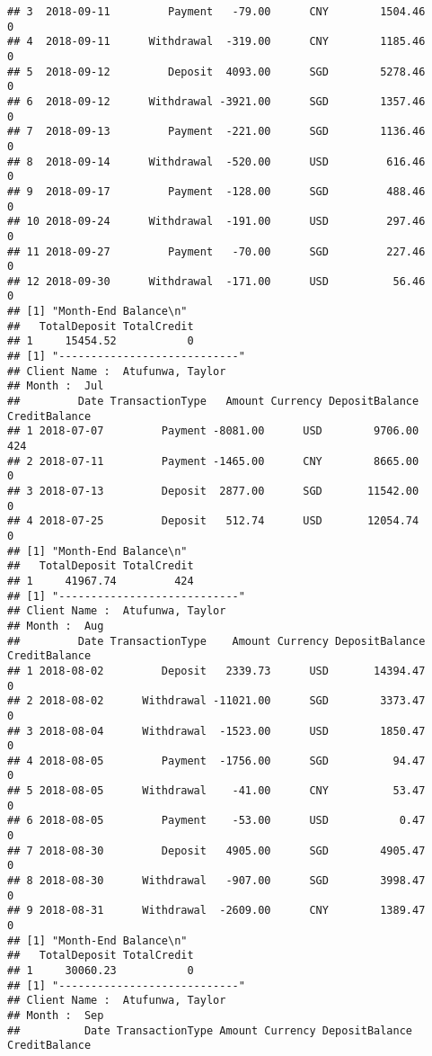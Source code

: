 \documentclass[]{article}
\begin{document}
\begin{verbatim}
## 3  2018-09-11         Payment   -79.00      CNY        1504.46             0
## 4  2018-09-11      Withdrawal  -319.00      CNY        1185.46             0
## 5  2018-09-12         Deposit  4093.00      SGD        5278.46             0
## 6  2018-09-12      Withdrawal -3921.00      SGD        1357.46             0
## 7  2018-09-13         Payment  -221.00      SGD        1136.46             0
## 8  2018-09-14      Withdrawal  -520.00      USD         616.46             0
## 9  2018-09-17         Payment  -128.00      SGD         488.46             0
## 10 2018-09-24      Withdrawal  -191.00      USD         297.46             0
## 11 2018-09-27         Payment   -70.00      SGD         227.46             0
## 12 2018-09-30      Withdrawal  -171.00      USD          56.46             0
## [1] "Month-End Balance\n"
##   TotalDeposit TotalCredit
## 1     15454.52           0
## [1] "----------------------------"
## Client Name :  Atufunwa, Taylor 
## Month :  Jul 
##         Date TransactionType   Amount Currency DepositBalance CreditBalance
## 1 2018-07-07         Payment -8081.00      USD        9706.00           424
## 2 2018-07-11         Payment -1465.00      CNY        8665.00             0
## 3 2018-07-13         Deposit  2877.00      SGD       11542.00             0
## 4 2018-07-25         Deposit   512.74      USD       12054.74             0
## [1] "Month-End Balance\n"
##   TotalDeposit TotalCredit
## 1     41967.74         424
## [1] "----------------------------"
## Client Name :  Atufunwa, Taylor 
## Month :  Aug 
##         Date TransactionType    Amount Currency DepositBalance CreditBalance
## 1 2018-08-02         Deposit   2339.73      USD       14394.47             0
## 2 2018-08-02      Withdrawal -11021.00      SGD        3373.47             0
## 3 2018-08-04      Withdrawal  -1523.00      USD        1850.47             0
## 4 2018-08-05         Payment  -1756.00      SGD          94.47             0
## 5 2018-08-05      Withdrawal    -41.00      CNY          53.47             0
## 6 2018-08-05         Payment    -53.00      USD           0.47             0
## 7 2018-08-30         Deposit   4905.00      SGD        4905.47             0
## 8 2018-08-30      Withdrawal   -907.00      SGD        3998.47             0
## 9 2018-08-31      Withdrawal  -2609.00      CNY        1389.47             0
## [1] "Month-End Balance\n"
##   TotalDeposit TotalCredit
## 1     30060.23           0
## [1] "----------------------------"
## Client Name :  Atufunwa, Taylor 
## Month :  Sep 
##          Date TransactionType Amount Currency DepositBalance CreditBalance

\end{verbatim}
\end{document}
